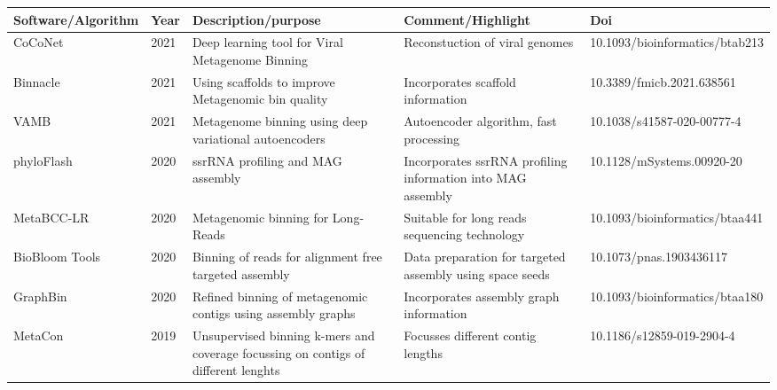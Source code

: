 \begin{tabular}{p{2cm}|p{0.6cm}|p{4cm}|p{4cm}|p{3.4cm}}
\toprule
Software/Algorithm &  Year &                                                                        Description/purpose &                                                                Comment/Highlight &                             Doi \\
\midrule
           CoCoNet &  2021 &                                            Deep learning tool for Viral Metagenome Binning &                                                   Reconstuction of viral genomes &  10.1093/bioinformatics/btab213 \\
          Binnacle &  2021 &                                         Using scaffolds to improve Metagenomic bin quality &                                                Incorporates scaffold information &       10.3389/fmicb.2021.638561 \\
              VAMB &  2021 &                                     Metagenome binning using deep variational autoencoders &                                          Autoencoder algorithm, fast processing  &      10.1038/s41587-020-00777-4 \\
        phyloFlash &  2020 &                                                          ssrRNA profiling and MAG assembly &                      Incorporates ssrRNA profiling information into MAG assembly &       10.1128/mSystems.00920-20 \\
        MetaBCC-LR &  2020 &                                                         Metagenomic binning for Long-Reads &                                    Suitable for long reads sequencing technology &  10.1093/bioinformatics/btaa441 \\
    BioBloom Tools &  2020 &                                      Binning of reads for alignment free targeted assembly &                         Data preparation for targeted assembly using space seeds &         10.1073/pnas.1903436117 \\
          GraphBin &  2020 &                               Refined binning of metagenomic contigs using assembly graphs &                                          Incorporates assembly graph information &  10.1093/bioinformatics/btaa180 \\
           MetaCon &  2019 &         Unsupervised binning k-mers and coverage focussing on contigs of different lenghts &                                                Focusses different contig lengths &       10.1186/s12859-019-2904-4 \\

\end{tabular}

